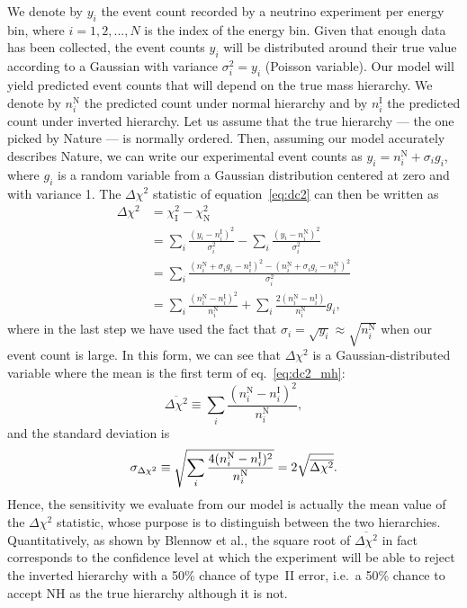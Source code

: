 We denote by $y_i$ the event count recorded by a neutrino experiment per energy
bin, where $i = 1, 2, ..., N$ is the index of the energy bin.
Given that enough data has been collected,
the event counts $y_i$ will be distributed around their true value
according to a Gaussian with variance $\sigma^2_i=y_i$ (Poisson variable). 
Our model will yield predicted event counts that will depend on
the true mass hierarchy.  We denote by $n^\text{N}_i$ the predicted count under normal
hierarchy and by $n^\text{I}_i$ the predicted count under inverted hierarchy.
Let us assume that the true hierarchy --- the one picked by Nature --- is normally
ordered. Then, assuming our model accurately describes Nature,  we can write
our experimental event counts as $y_i = n^\text{N}_i + \sigma_i g_i$, where
$g_i$ is a random variable from a Gaussian distribution centered at zero and
with variance 1.
The $\Delta \chi^2$ statistic of equation~\ref{eq:dc2} can then be written as
\begin{align}
	\Delta \chi^2 &= \chi_\text{I}^2 - \chi_\text{N}^2\nonumber\\
	&= \sum_i \frac{(y_i - n^\text{I}_i)^2}{\sigma_i^2} - \sum_i \frac{(y_i -
	n^\text{N}_i)^2}{\sigma_i^2}\nonumber\\
	&= \sum_i \frac{(n^\text{N}_i + \sigma_i g_i - n^\text{I}_i)^2 - (n^\text{N}_i + \sigma_i g_i -
	n^\text{N}_i)^2}{\sigma_i^2}\nonumber\\
	&= \sum_i \frac{(n^\text{N}_i - n^\text{I}_i)^2}{n^\text{N}_i} + \sum_i
	\frac{2(n^\text{N}_i -
	n^\text{I}_i)}{n^\text{N}_i} g_i,\label{eq:dc2_mh}
\end{align}
where in the last step we have used the fact that $\sigma_i = \sqrt{y_i}
\approx \sqrt{n^\text{N}_i}$ when our event count is large.
In this form, we can see that $\Delta \chi^2$ is a Gaussian-distributed
variable where the mean is the first term of eq.~\ref{eq:dc2_mh}:
\begin{equation}
	\overline{\Delta\chi^2} \equiv \sum_i \frac{(n^\text{N}_i -
n^\text{I}_i)^2}{n^\text{N}_i},\label{eq:mean_dc2_mh}\end{equation}
and the standard deviation is
$$\sigma_{\Delta\chi^2} \equiv \sqrt{\sum_i \frac{4(n^\text{N}_i -
n^\text{I}_i)^2}{n^\text{N}_i}}\\
= 2\sqrt{\overline{\Delta\chi^2}}.$$
Hence, the sensitivity we evaluate from our model is actually the mean value of
the $\Delta\chi^2$ statistic, whose purpose is to distinguish between the two
hierarchies. Quantitatively, as shown by Blennow et al.\cite{blennow}, the square root of
$\overline{\Delta\chi^2}$ in fact corresponds to the confidence level at which the
experiment will be able to reject the inverted hierarchy with a 50\% chance of
type~II error, i.e.~a 50\% chance to accept NH as the true hierarchy although
it is not.


